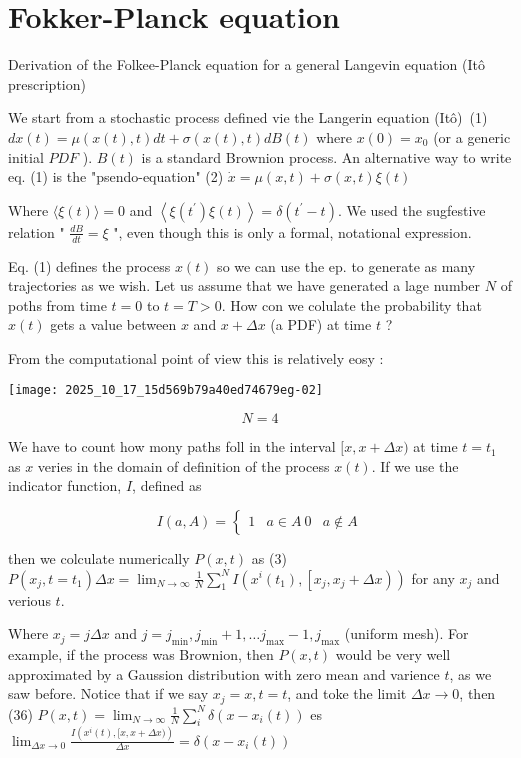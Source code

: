 \section{Fokker-Planck equation}
Derivation of the Folkee-Planck equation for a general Langevin equation (Itô prescription)

We start from a stochastic process defined vie the Langerin equation (Itô)\
(1) \quad $d x(t)=\mu(x(t), t) d t+\sigma(x(t), t) d B(t)$
where $x(0)=x_{0}$ (or a generic initial $P D F$ ). $B(t)$ is a standard Brownion process.
An alternative way to write eq. (1) is the "psendo-equation"
(2) $\dot{x}=\mu(x, t)+\sigma(x, t) \xi(t)$

Where $\langle\xi(t)\rangle=0$ and $\left\langle\xi\left(t^{\prime}\right) \xi(t)\right\rangle=\delta\left(t^{\prime}-t\right)$. We used the sugfestive relation " $\frac{d B}{d t}=\xi$ ", even though this is only a formal, notational expression.

Eq. (1) defines the process $x(t)$ so we can use the ep. to generate as many trajectories as we wish. Let us assume that we have generated a lage number $N$ of poths from time $t=0$ to $t=T>0$. How con we colulate the probability that $x(t)$ gets a value between $x$ and $x+\Delta x$ (a PDF) at time $t$ ?

From the computational point of view this is relatively eosy :
\begin{center}
\texttt{[image: 2025\_10\_17\_15d569b79a40ed74679eg-02]}
\end{center}

$$
N=4
$$

We have to count how mony paths foll in the interval $[x, x+\Delta x)$ at time $t=t_{1}$ as $x$ veries in the domain of definition of the process $x(t)$.
If we use the indicator function, $I$, defined as

$$ I(a, A)= \begin{cases}
1 & a \in A \ 0 & a \notin A
\end{cases}
$$

then we colculate numerically $P(x, t)$ as
(3) $P\left(x_{j}, t=t_{1}\right) \Delta x=\lim _{N \rightarrow \infty} \frac{1}{N} \sum_{1}^{N} I\left(x^{i}\left(t_{1}\right),\left[x_{j}, x_{j}+\Delta x\right)\right)$ for any $x_{j}$ and verious $t$.

Where $x_{j}=j \Delta x$ and $j=j_{\min }, j_{\min }+1, \ldots j_{\max }-1, j_{\max }$ (uniform mesh). For example, if the process was Brownion, then $P(x, t)$ would be very well approximated by a Gaussion distribution with zero mean and varience $t$, as we saw before. Notice that if we say $x_{j}=x, t=t$, and toke the limit $\Delta x \rightarrow 0$, then
(36) $P(x, t)=\lim _{N \rightarrow \infty} \frac{1}{N} \sum_{i}^{N} \delta\left(x-x_{i}(t)\right)$ es $\lim _{\Delta x \rightarrow 0} \frac{I\left(x^{i}(t),[x, x+\Delta x)\right)}{\Delta x}=\delta\left(x-x_{i}(t)\right)$

